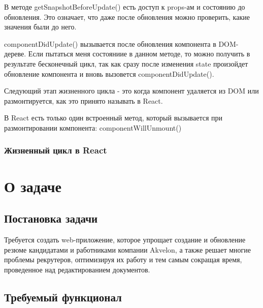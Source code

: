 \documentclass[a4paper,12pt]{diplom}
\begin{document}
В методе getSnapshotBeforeUpdate() есть доступ к props-ам и состоянию до обновления. Это означает, что даже после обновления можно проверить, какие значения были до него.

componentDidUpdate() вызывается после обновления компонента в DOM-дереве. Если пытаться меня состояниие в данном методе, то можно получить в результате бесконечный цикл, так как сразу после изменения state произойдет обновление компонента и вновь вызовется componentDidUpdate().

Следующий этап жизненного цикла - это когда компонент удаляется из DOM или размонтируется, как это принято называть в React.

В React есть только один встроенный метод, который вызывается при размонтировании компонента: componentWillUnmount()

\subsection{Жизненный цикл в React}

\chapter{О задаче}

\section{Постановка задачи}

Требуется создать web-приложение, которое упрощает создание и обновление резюме кандидатами и работниками компании Akvelon,
а также решает многие проблемы рекрутеров, оптимизируя их работу и тем самым сокращая время,
проведенное над редактированием документов.

\section{Требуемый функционал}
\end{document}
